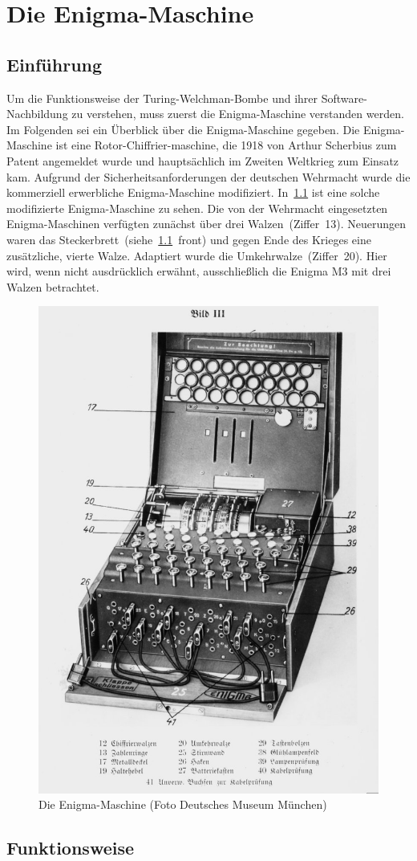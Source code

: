 \chapter{Die Enigma-Maschine}\label{ch:die-enigma}
\section{Einführung}\label{sec:einfuhrung}

Um die Funktionsweise der Turing-Welchman-Bombe und ihrer Software-Nachbildung zu verstehen, muss zuerst die Enigma-Maschine verstanden werden.
Im Folgenden sei ein Überblick über die Enigma-Maschine gegeben.
Die Enigma-Maschine ist eine Rotor-Chiffrier-\allowbreak maschine, die 1918 von Arthur Scherbius zum Patent angemeldet wurde und hauptsächlich im Zweiten Weltkrieg zum Einsatz kam.
Aufgrund der Sicherheitsanforderungen der deutschen Wehrmacht wurde die kommerziell erwerbliche Enigma-Maschine modifiziert.
In~\cref{fig:enigma_complete} ist eine solche modifizierte Enigma-Maschine zu sehen.
Die von der Wehrmacht eingesetzten Enigma-Maschinen verfügten zunächst über drei Walzen~(Ziffer~13).
Neuerungen waren das Steckerbrett~(siehe~\cref{fig:enigma_complete}~front) und gegen Ende des Krieges eine zusätzliche, vierte Walze. 
Adaptiert wurde die Umkehrwalze~(Ziffer~20).
Hier wird, wenn nicht ausdrücklich erwähnt, ausschließlich die Enigma M3 mit drei Walzen betrachtet.
\nopagebreak
\begin{figure}[htbp]
	\centering
	\includegraphics[width=.42\linewidth]{Enigma/Enigma-plakat}
	\caption{Die Enigma-Maschine (Foto Deutsches Museum München)}
	\label{fig:enigma_complete}
\end{figure}

\newpage

\section{Funktionsweise}\label{sec:funktionsweise}

